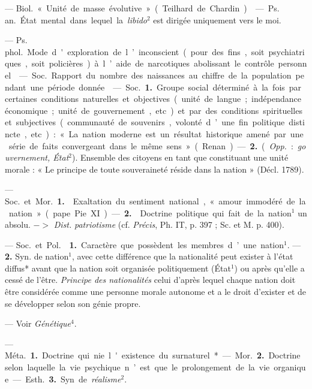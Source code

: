 
	\begin{itemize}[leftmargin=1cm, label=, itemsep=1pt]

 — \si{Biol.} « Unité de masse évolutive » (Teilhard de Chardin).

 — \si{Ps. an.} État mental dans lequel la {\it libido}$^2$
est dirigée uniquement vers le moi.

 — \si{Ps. phol.} Mode d'exploration de l’inconscient (pour
des fins, soit psychiatriques, soit
policières) à l’aide de narcotiques abolissant le contrôle personnel.

 — \si{Soc.} Rapport du nombre des naissances au chiffre de la
population pendant une période donnée.

 — \si{Soc.} {\bf 1.} Groupe social déterminé à la fois par
certaines conditions naturelles et objectives (unité de langue ; indépendance
économique ; unité de gouvernement, etc.) et par des conditions spirituelles
et subjectives (communauté de souvenirs, volonté d’une fin politique
distincte, etc.) : « La nation moderne est un résultat historique amené par
une série de faits convergeant dans le même sens » (Renan). — {\bf 2.}
({\it Opp.} : {\it gouvernement, État}$^2$). Ensemble des citoyens en tant
que constituant une unité morale : « Le principe de toute souveraineté réside
dans la nation » (Décl. 1789).

 — \si{Soc.} et \si{Mor.} {\bf 1.} 
Exaltation du sentiment national, « amour immodéré de la nation » (pape Pie
XI). — {\bf 2.}  Doctrine politique qui fait de la nation$^1$
un absolu. $->$ {\it Dist.} {\it patriotisme} (cf. {\it Précis}, Ph. IT, p.
397 ; Sc. et M. p. 400).

 — \si{Soc.} et \si{Pol.}  {\bf 1.} Caractère
que possèdent les membres d’une nation$^1$. —  {\bf 2.} Syn.
de nation$^1$, avec cette différence que la nationalité peut exister à l’état
diffus* avant que la nation soit organisée politiquement (État$^1$) ou après
qu’elle a cessé de l’être. {\it Principe des nationalités} celui d’après
lequel chaque nation doit être considérée comme une personne morale autonome
et a le droit d’exister et de se développer selon son génie propre.

 — Voir {\it Génétique}$^4$.

 —  \si{Méta.} {\bf 1.} Doctrine qui nie
l'existence du surnaturel*. — \si{Mor.} {\bf 2.} Doctrine selon laquelle la
vie psychique n’est que le prolongement de la vie organique. — \si{Esth.}
{\bf 3.} Syn. de {\it réalisme}$^2$.


\end{itemize}
